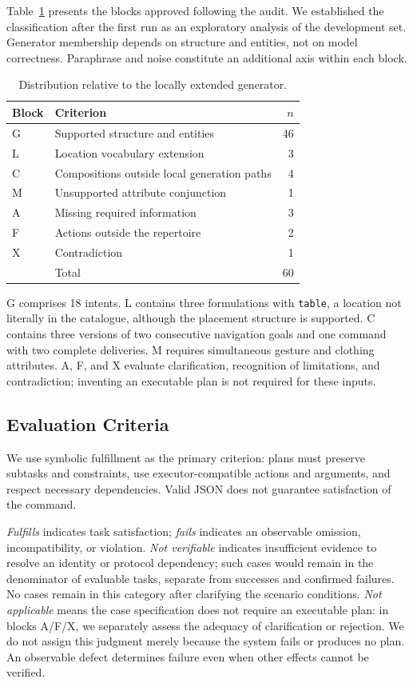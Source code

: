 \documentclass[a4paper,twoside]{article}
\begin{document}
Table~\ref{tab:bloques_piloto} presents the blocks approved following the audit. We established the classification after the first run as an exploratory analysis of the development set. Generator membership depends on structure and entities, not on model correctness. Paraphrase and noise constitute an additional axis within each block.

\begin{table}[htbp]
\centering\small
\caption{Distribution relative to the locally extended generator.}
\label{tab:bloques_piloto}
\begin{tabularx}{\columnwidth}{@{}l>{\raggedright\arraybackslash}Xr@{}}
\toprule
Block & Criterion & $n$ \\
\midrule
G & Supported structure and entities & 46 \\
L & Location vocabulary extension & 3 \\
C & Compositions outside local generation paths & 4 \\
M & Unsupported attribute conjunction & 1 \\
A & Missing required information & 3 \\
F & Actions outside the repertoire & 2 \\
X & Contradiction & 1 \\
\midrule
 & Total & 60 \\
\bottomrule
\end{tabularx}
\end{table}

G comprises 18 intents. L contains three formulations with \texttt{table}, a location not literally in the catalogue, although the placement structure is supported. C contains three versions of two consecutive navigation goals and one command with two complete deliveries. M requires simultaneous gesture and clothing attributes. A, F, and X evaluate clarification, recognition of limitations, and contradiction; inventing an executable plan is not required for these inputs.

\subsection{Evaluation Criteria}
We use symbolic fulfillment as the primary criterion: plans must preserve subtasks and constraints, use executor-compatible actions and arguments, and respect necessary dependencies. Valid JSON does not guarantee satisfaction of the command.

\emph{Fulfills} indicates task satisfaction; \emph{fails} indicates an observable omission, incompatibility, or violation. \emph{Not verifiable} indicates insufficient evidence to resolve an identity or protocol dependency; such cases would remain in the denominator of evaluable tasks, separate from successes and confirmed failures. No cases remain in this category after clarifying the scenario conditions. \emph{Not applicable} means the case specification does not require an executable plan: in blocks A/F/X, we separately assess the adequacy of clarification or rejection. We do not assign this judgment merely because the system fails or produces no plan. An observable defect determines failure even when other effects cannot be verified.
\end{document}
